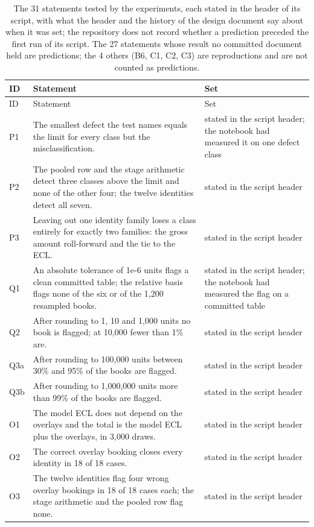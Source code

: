 \begin{longtable}{lp{7.6cm}p{4.4cm}}
\caption{The 31 statements tested by the experiments, each stated in the header of its script, with what the header and the history of the design document say about when it was set; the repository does not record whether a prediction preceded the first run of its script. The 27 statements whose result no committed document held are predictions; the 4 others (B6, C1, C2, C3) are reproductions and are not counted as predictions.}\label{tab:hypotheses}\\
\toprule
ID & Statement & Set \\
\midrule
\endfirsthead
\toprule
ID & Statement & Set \\
\midrule
\endhead
\bottomrule
\endfoot
P1 & The smallest defect the test names equals the limit for every class but the misclassification. & stated in the script header; the notebook had measured it on one defect class \\
P2 & The pooled row and the stage arithmetic detect three classes above the limit and none of the other four; the twelve identities detect all seven. & stated in the script header \\
P3 & Leaving out one identity family loses a class entirely for exactly two families: the gross amount roll-forward and the tie to the ECL. & stated in the script header \\
Q1 & An absolute tolerance of 1e-6 units flags a clean committed table; the relative basis flags none of the six or of the 1,200 resampled books. & stated in the script header; the notebook had measured the flag on a committed table \\
Q2 & After rounding to 1, 10 and 1,000 units no book is flagged; at 10,000 fewer than 1\% are. & stated in the script header \\
Q3a & After rounding to 100,000 units between 30\% and 95\% of the books are flagged. & stated in the script header \\
Q3b & After rounding to 1,000,000 units more than 99\% of the books are flagged. & stated in the script header \\
O1 & The model ECL does not depend on the overlays and the total is the model ECL plus the overlays, in 3,000 draws. & stated in the script header \\
O2 & The correct overlay booking closes every identity in 18 of 18 cases. & stated in the script header \\
O3 & The twelve identities flag four wrong overlay bookings in 18 of 18 cases each; the stage arithmetic and the pooled row flag none. & stated in the script header \\

\end{longtable}
